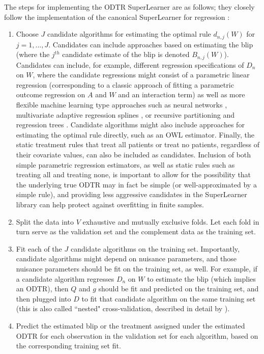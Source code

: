 \documentclass[a4paper,12pt]{article}
\begin{document}
The steps for implementing the ODTR SuperLearner are as follows; they closely follow the implementation of the canonical SuperLearner for regression \citep{polley2010super}:
\begin{enumerate}
\item Choose $J$ candidate algorithms for estimating the optimal rule $d_{n,j}(W)$ for $j=1,...,J$. Candidates can include approaches based on estimating the blip (where the $j^{th}$ candidate estimate of the blip is denoted $B_{n,j}(W)$). Candidates can include, for example, different regression specifications of $D_n$  on $W$, where the candidate regressions might consist of a parametric linear regression (corresponding to a classic approach of fitting a parametric outcome regression on $A$ and $W$ and an interaction term) as well as more flexible machine learning type approaches such as neural networks \citep{ripley1996pattern}, multivariate adaptive regression splines \citep{friedman1991multivariate}, or recursive partitioning and regression trees \citep{breiman2017classification}. Candidate algorithms might also include approaches for estimating the optimal rule directly, such as an OWL estimator. Finally, the static treatment rules that treat all patients or treat no patients, regardless of their covariate values, can also be included as candidates. Inclusion of both simple parametric regression estimators, as well as static rules such as treating all and treating none, is important to allow for the possibility that the underlying true ODTR may in fact be simple (or well-approximated by a simple rule), and providing less aggressive candidates in the SuperLearner library can help protect against overfitting in finite samples. 
\item Split the data into $V$ exhaustive and mutually exclusive folds. Let each fold in turn serve as the validation set and the complement data as the training set.
\item Fit each of the $J$ candidate algorithms on the training set. Importantly, candidate algorithms might depend on nuisance parameters, and those nuisance parameters should be fit on the training set, as well. For example, if a candidate algorithm regresses $D_n$ on $W$ to estimate the blip (which implies an ODTR), then $Q$ and $g$ should be fit and predicted on the training set, and then plugged into $D$ to fit that candidate algorithm on the same training set (this is also called ``nested" cross-validation, described in detail by \cite{coyle2017computational}). 
\item Predict the estimated blip or the treatment assigned under the estimated ODTR for each observation in the validation set for each algorithm, based on the corresponding training set fit.

\end{enumerate}
\end{document}
